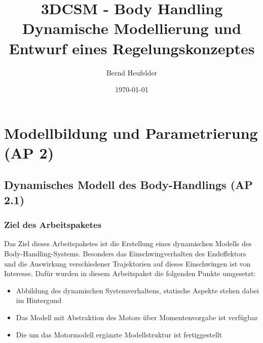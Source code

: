 \documentclass[10pt,a4paper]{iace.report}
\title{3DCSM - Body Handling\\\small Dynamische Modellierung und Entwurf eines Regelungskonzeptes}
\author{Bernd Heufelder}
\date{\today}
\begin{document}
	\maketitle
	\tableofcontents
	\newpage
	\chapter{Modellbildung und Parametrierung (AP 2)}
		\section{Dynamisches Modell des Body-Handlings (AP 2.1)}
			\subsection{Ziel des Arbeitspaketes}
				Das Ziel dieses Arbeitspaketes ist die Erstellung eines dynamischen Modells des Body-Handling-Systems. Besonders das Einschwingverhalten des Endeffektors und die Auswirkung verschiedener Trajektorien auf dieses Einschwingen ist von Interesse. Dafür wurden in diesem Arbeitspaket die folgenden Punkte umgesetzt:
				\begin{itemize}
					\item Abbildung des dynamischen Systemverhaltens, statische Aspekte stehen dabei im Hintergund
					\item Das Modell mit Abstraktion des Motors über Momentenvorgabe ist verfügbar
					\item Die um das Motormodell ergänzte Modellstruktur ist fertiggestellt
				\end{itemize}
\end{document}
